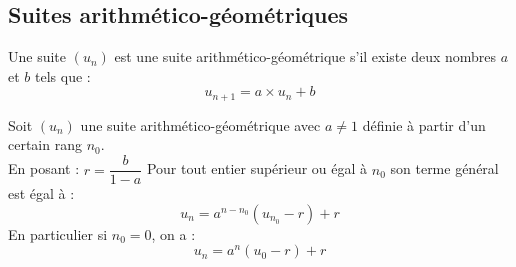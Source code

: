 \documentclass[11pt]{article}
\begin{document}
\subsection{Suites  arithmético-géométriques}

\begin{definition}
Une suite $(u_n)$ est une suite arithmético-géométrique s'il existe
deux nombres $a$ et $b$ tels que :
\[ u_{n+1} = a \times u_n + b \]
\end{definition}

\begin{theoreme}
Soit $(u_n)$ une suite arithmético-géométrique avec $a \neq 1$ définie à
partir d'un certain rang $n_0$.\\
En posant : $r = \dfrac{b}{1-a}$
Pour tout entier supérieur ou égal à $n_0$ son terme général est égal
à :
\[ u_n = a^{n-n_0}(u_{n_0}-r)+r\]
En particulier si $n_0=0$, on a : 
\[ u_n = a^n(u_0-r)+r\]
\end{theoreme}
\end{document}
